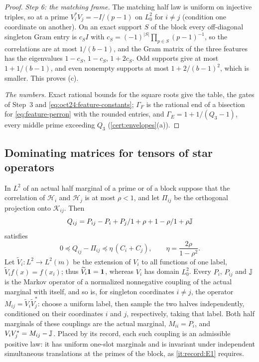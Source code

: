\begin{proof}
\emph{Step 6: the matching frame.} The matching half law is uniform on injective
triples, so at a prime $V_i^*V_j=-I/(p-1)$ on $L^2_0$ for $i\ne j$ (condition one
coordinate on another). On an exact support $S$ of the block every off-diagonal
singleton Gram entry is $c_SI$ with $c_S=(-1)^{|S|}\prod_{p\in S}(p-1)^{-1}$, so the
correlations are at most $1/(b-1)$, and the Gram matrix of the three features has
the eigenvalues $1-c_S$, $1-c_S$, $1+2c_S$. Odd supports give at most $1+1/(b-1)$,
and even nonempty supports at most $1+2/(b-1)^2$, which is smaller. This proves (c).

\emph{The numbers.} Exact rational bounds for the square roots give the table, the
gates of Step~3 and \eqref{eq:oct24:feature-constants}; $\Gamma_F$ is the rational
end of a bisection for \eqref{eq:feature-perron} with the rounded entries, and
$\Gamma_E=1+1/(Q_3-1)$, every middle prime exceeding $Q_3$
(\cref{cert:envelopes}(a)).
\end{proof}

\subsection{Dominating matrices for tensors of star operators}
\label{subsec:envelope-tools}

\begin{lemma}
\label{lem:oct24:pure-pair-substitute}
In $L^2$ of an actual half marginal of a prime or of a block suppose that the
correlation of $\mathcal H_i$ and $\mathcal H_j$ is at most $\rho<1$, and let $\Pi_{ij}$ be
the orthogonal projection onto $\mathcal K_{ij}$. Then
\[
 Q_{ij}=P_{ij}-P_i+P_j/1+\rho+1-\rho/1+\rho\mathbb J
\]
satisfies
\begin{equation}\label{eq:oct24:pure-pair-substitute}
 0\preceq Q_{ij}-\Pi_{ij}\preceq\eta\,(C_i+C_j),\qquad
 \eta=\frac{2\rho}{1-\rho^2}.
\end{equation}
Let $\widetilde V_i\colon L^2\to L^2(m)$ be the extension of $V_i$ to
all functions of one label, $\widetilde V_if(x)=f(x_i)$; thus
$\widetilde V_i\mathbf 1=\mathbf 1$, whereas $V_i$ has domain $L^2_0$.
Every $P_i$, $P_{ij}$ and $\mathbb J$ is the Markov operator of a normalized
nonnegative coupling of the actual marginal with itself, and so is, for singleton
coordinates $i\ne j$, the operator $M_{ij}=\widetilde V_i\widetilde V_j^*$: choose a uniform label, then
sample the two halves independently, conditioned on their coordinates $i$ and $j$,
respectively, taking that label. Both half marginals of these couplings are the
actual marginal, $M_{ii}=P_i$, and $V_iV_j^*=M_{ij}-\mathbb J$. Placed by its
record, each such coupling is an admissible positive law: it has uniform one-slot
marginals and is invariant under independent simultaneous translations at the
primes of the block, as \ref{it:record:E1} requires.
\end{lemma}

